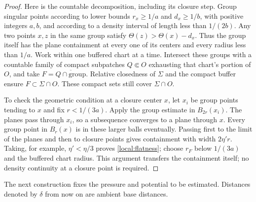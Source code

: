 \begin{proof}
Here is the countable decomposition, including its closure step.
Group singular points according to lower bounds
$r_x\ge1/a$ and $d_x\ge1/b$, with positive integers $a,b$, and according
to a density interval of length less than $1/(2b)$.  Any two points
$x,z$ in the same group satisfy $\Theta(z)>\Theta(x)-d_x$.
Thus the group itself has the plane containment at every one of its
centers and every radius less than $1/a$.  Work within one buffered chart at a time.  Intersect these groups
with a countable family of compact subpatches $Q\Subset O$ exhausting
that chart's portion of $O$, and take
$F=\overline{Q\cap\text{group}}$.  Relative closedness of $\Sigma$
and the compact buffer ensure $F\subset\Sigma\cap O$.
These compact sets still cover $\Sigma\cap O$.

To check the geometric condition at a closure center $x$, let
$x_i$ be group points tending to $x$ and fix $r<1/(3a)$.  Apply the
group estimate in $B_{2r}(x_i)$.  The planes pass through $x_i$, so a
subsequence converges to a plane through $x$.  Every group point in
$B_r(x)$ is in these larger balls eventually.  Passing first to the
limit of the planes and then to closure points gives containment with
width $2\eta'r$.  Taking, for example, $\eta'<\eta/3$ proves
\eqref{local:flatness}; choose $r_F$ below $1/(3a)$ and the buffered
chart radius.  This argument transfers the containment
itself; no density continuity at a closure point is required.
\end{proof}

The next construction fixes the pressure and potential to be estimated.
Distances denoted by $\delta$ from now on are ambient base distances.

